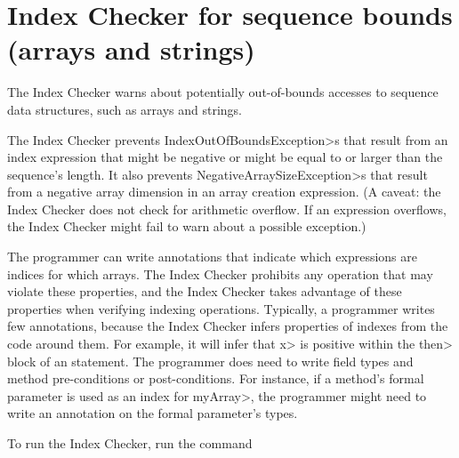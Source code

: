 \chapter{Index Checker for sequence bounds (arrays and strings)\label{index-checker}}

The Index Checker warns about potentially out-of-bounds accesses to sequence
data structures, such as arrays
and strings.

The Index Checker prevents \<IndexOutOfBoundsException>s that result from
an index expression that might be negative or might be equal to or larger
than the sequence's length.
It also prevents \<NegativeArraySizeException>s that result from a negative
array dimension in an array creation expression.
(A caveat:  the Index Checker does not check for arithmetic overflow.  If
an expression overflows, the Index Checker might fail to warn about a
possible exception.)

%

The programmer can write annotations that indicate which expressions are
indices for which arrays.  The Index Checker prohibits any operation that
may violate these properties, and the Index Checker takes advantage of
these properties when verifying indexing operations.
%
Typically, a programmer writes few annotations, because the Index Checker
infers properties of indexes from
the code around them. For example, it will infer that \<x> is positive
within the \<then> block of an  statement.
The programmer does need to write field types and method pre-conditions or post-conditions. For instance,
if a method's formal parameter is used as an index for
\<myArray>, the programmer might need to
write an 
annotation on the formal parameter's types.

To run the Index Checker, run the command

